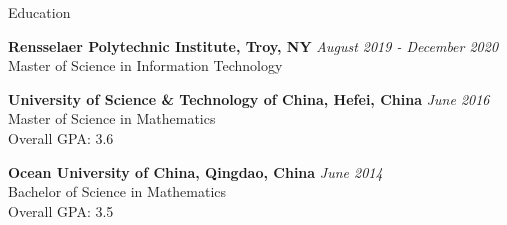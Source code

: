 \documentclass{resume} %
\begin{document}

\begin{rSection}{Education}

{\bf Rensselaer Polytechnic Institute, Troy, NY} \hfill {\em August 2019 - December 2020}
\\ Master of Science in Information Technology

{\bf University of Science \& Technology of China, Hefei, China} \hfill {\em June 2016}
\\ Master of Science in Mathematics
\\ { Overall GPA: 3.6}

{\bf Ocean University of China, Qingdao, China} \hfill {\em June 2014}
\\ Bachelor of Science in Mathematics
\\ { Overall GPA: 3.5}
\end{rSection}

\end{document}
